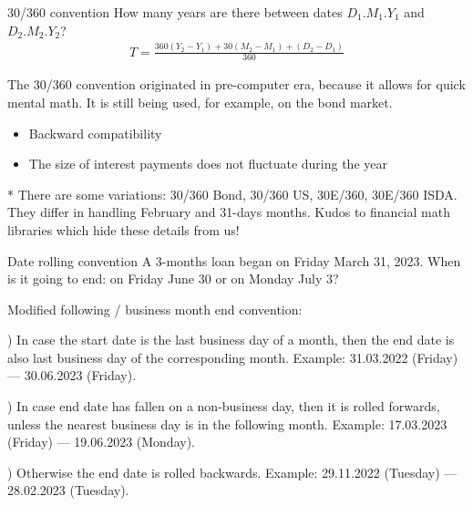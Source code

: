 \documentclass{beamer}
\begin{document}
\begin{frame}{30/360 convention}
\justify
How many years are there between dates $D_1.M_1.Y_1$ and $D_2.M_2.Y_2$?
\begin{align*}
T = \frac{360(Y_2-Y_1) + 30(M_2-M_1) + (D_2-D_1)}{360}
\end{align*}

\justify
The 30/360 convention originated in pre-computer era, because it allows for quick mental math. It is still being used, for example, on the bond market.
\begin{itemize}
\item Backward compatibility
\item The size of interest payments does not fluctuate during the year
\end{itemize}

\vspace{\baselineskip}
\justify
* There are some variations: 30/360 Bond, 30/360 US, 30E/360, 30E/360 ISDA. They differ in handling February and 31-days months. Kudos to financial math libraries which hide these details from us!
\end{frame}



\begin{frame}{Date rolling convention}
\justify
A 3-months loan began on Friday March 31, 2023. When is it going to end: on Friday June 30 or on Monday July 3?

\justify
Modified following / business month end convention:

) In case the start date is the last business day of a month, then the end date is also last business day of the corresponding month. Example: 31.03.2022 (Friday) --- 30.06.2023 (Friday).

) In case end date has fallen on a non-business day, then it is rolled forwards, unless the nearest business day is in the following month. Example: 17.03.2023 (Friday) --- 19.06.2023 (Monday).

) Otherwise the end date is rolled backwards. Example: 29.11.2022 (Tuesday) --- 28.02.2023 (Tuesday).
\end{frame}
\end{document}
